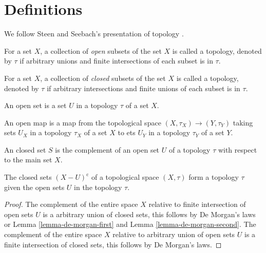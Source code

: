 \section{Definitions}

We follow Steen and Seebach's presentation of topology \cite{Steen1995}.

\begin{definition}
	\label{definition-topology-open-sets}
	For a set $X$, a collection of \textit{open} subsets 
	of the set $X$ is called a topology, denoted by $\tau$ 
	if arbitrary unions and finite intersections of each subset is in $\tau$.
\end{definition}

\begin{definition}
	\label{definition-topology-closed-sets}
	For a set $X$, a collection of \textit{closed} subsets 
	of the set $X$ is called a topology, denoted by $\tau$ 
	if arbitrary intersections and finite unions of each subset
	is in $\tau$.
\end{definition}

\begin{definition}
	\label{definition-open-set}
	An open set is a set $U$ in a topology $\tau$ of a set $X$.
\end{definition}

\begin{definition}
	\label{definition-open-map}
	An open map is a map from the topological space $(X, \tau_X) \rightarrow (Y, \tau_Y)$ taking sets $U_X$ in a topology $\tau_X$ of a set $X$ to ets $U_Y$ in a topology $\tau_Y$ of a set $Y$.
\end{definition}

\begin{definition}
	\label{definition-closed-set}
	An closed set $S$ is the complement of an open set $U$ 
	of a topology $\tau$ with respect to the main set $X$.
\end{definition}

\begin{lemma}
	The closed sets $(X - U)^\mathrm{c}$ 
	of a topological space $(X, \tau)$ form
	a topology $\tau$ given the open sets $U$ in the topology $\tau$.
\end{lemma}

\begin{proof}
	The complement of the entire space $X$ relative to finite intersection of open sets $U$
	is a arbitrary union of closed sets, this follows by De Morgan's laws or Lemma \ref{lemma-de-morgan-first} and Lemma \ref{lemma-de-morgan-second}.
	The complement of the entire space $X$ relative to arbitrary union of open sets $U$
	is a finite intersection of closed sets, this follows by De Morgan's laws.
\end{proof}

